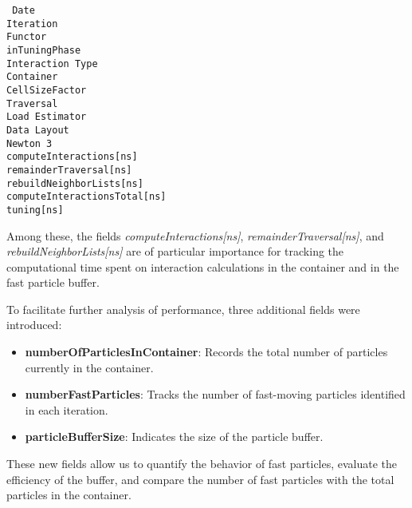 \begin{multicols}{2}
\raggedright
\texttt{
Date \\
Iteration \\
Functor \\
inTuningPhase \\
Interaction Type \\
Container \\
CellSizeFactor \\
Traversal \\
Load Estimator \\
Data Layout \\
Newton 3 \\
computeInteractions[ns] \\
remainderTraversal[ns] \\
rebuildNeighborLists[ns] \\
computeInteractionsTotal[ns] \\
tuning[ns]
}
\end{multicols}




Among these, the fields \textit{computeInteractions[ns]}, \textit{remainderTraversal[ns]}, and \textit{rebuildNeighborLists[ns]} are of particular importance for tracking the computational time spent on interaction calculations in the container and in the fast particle buffer.

To facilitate further analysis of performance, three additional fields were introduced:
\begin{itemize}
    \item \textbf{numberOfParticlesInContainer}: Records the total number of particles currently in the container.
    \item \textbf{numberFastParticles}: Tracks the number of fast-moving particles identified in each iteration.
    \item \textbf{particleBufferSize}: Indicates the size of the particle buffer.
\end{itemize}

These new fields allow us to quantify the behavior of fast particles, evaluate the efficiency of the buffer, and compare the number of fast particles with the total particles in the container. 